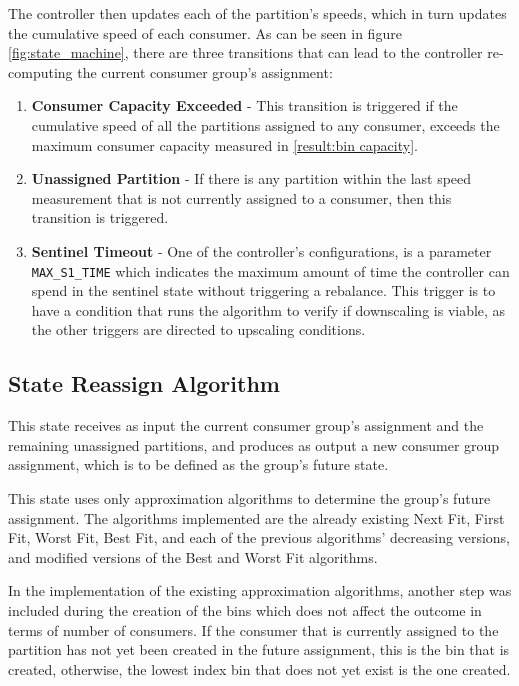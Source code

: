 The controller then updates each of the partition's speeds, which in turn
updates the cumulative speed of each consumer. As can be seen in figure
\ref{fig:state_machine}, there are three transitions that can lead to the
controller re-computing the current consumer group's assignment:
\begin{enumerate} \item \textbf{Consumer Capacity Exceeded} - This transition is
        triggered if the cumulative speed of all the partitions assigned to any
    consumer, exceeds the maximum consumer capacity measured in \ref{result:bin
capacity}.  \item \textbf{Unassigned Partition} - If there is any partition
    within the last speed measurement that is not currently assigned to a
        consumer, then this transition is triggered.  \item \textbf{Sentinel
            Timeout} - One of the controller's configurations, is a parameter
            \lstinline[language=Python]{MAX_S1_TIME} which indicates the maximum
            amount of time the controller can spend in the sentinel state
            without triggering a rebalance. This trigger is to have a condition
            that runs the algorithm to verify if downscaling is viable, as the
            other triggers are directed to upscaling conditions.
\end{enumerate}

\subsection{State Reassign Algorithm}

This state receives as input the current consumer group's assignment and the
remaining unassigned partitions, and produces as output a new consumer group
assignment, which is to be defined as the group's future state.

This state uses only approximation algorithms to determine the group's future
assignment. The algorithms implemented are the already existing Next Fit, First
Fit, Worst Fit, Best Fit, and each of the previous algorithms' decreasing
versions, and modified versions of the Best and Worst Fit algorithms. 

In the implementation of the existing approximation algorithms, another step was
included during the creation of the bins which does not affect the outcome in
terms of number of consumers. If the consumer that is currently assigned to the
partition has not yet been created in the future assignment, this is the bin
that is created, otherwise, the lowest index bin that does not yet exist is the
one created.
 
